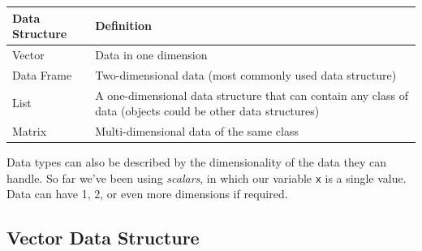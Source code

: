 \documentclass[]{book}
\begin{document}
\begin{longtable}[]{@{}ll@{}}
\toprule
\begin{minipage}[b]{0.18\columnwidth}\raggedright\strut
Data Structure\strut
\end{minipage} & \begin{minipage}[b]{0.24\columnwidth}\raggedright\strut
Definition\strut
\end{minipage}\tabularnewline
\midrule
\endhead
\begin{minipage}[t]{0.18\columnwidth}\raggedright\strut
Vector\strut
\end{minipage} & \begin{minipage}[t]{0.24\columnwidth}\raggedright\strut
Data in one dimension\strut
\end{minipage}\tabularnewline
\begin{minipage}[t]{0.18\columnwidth}\raggedright\strut
Data Frame\strut
\end{minipage} & \begin{minipage}[t]{0.24\columnwidth}\raggedright\strut
Two-dimensional data (most commonly used data structure)\strut
\end{minipage}\tabularnewline
\begin{minipage}[t]{0.18\columnwidth}\raggedright\strut
List\strut
\end{minipage} & \begin{minipage}[t]{0.24\columnwidth}\raggedright\strut
A one-dimensional data structure that can contain any class of data
(objects could be other data structures)\strut
\end{minipage}\tabularnewline
\begin{minipage}[t]{0.18\columnwidth}\raggedright\strut
Matrix\strut
\end{minipage} & \begin{minipage}[t]{0.24\columnwidth}\raggedright\strut
Multi-dimensional data of the same class\strut
\end{minipage}\tabularnewline
\bottomrule
\end{longtable}

Data types can also be described by the dimensionality of the data they
can handle. So far we've been using \emph{scalars}, in which our
variable \texttt{x} is a single value. Data can have 1, 2, or even more
dimensions if required.

\subsection{Vector Data Structure}\label{vector-data-structure}
\end{document}
